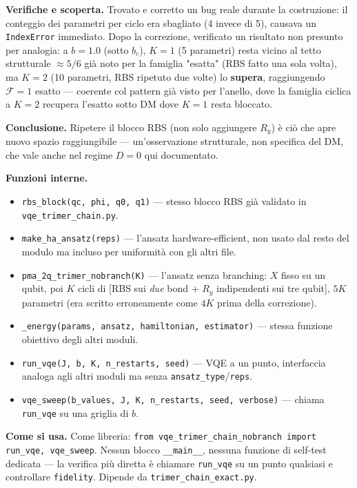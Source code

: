 \documentclass[11pt,a4paper]{article}
\begin{document}
\textbf{Verifiche e scoperta.} Trovato e corretto un bug reale durante la
costruzione: il conteggio dei parametri per ciclo era sbagliato (4 invece di 5),
causava un \texttt{IndexError} immediato. Dopo la correzione, verificato un risultato
non presunto per analogia: a $b=1.0$ (sotto $b_c$), $K=1$ (5 parametri) resta vicino al
tetto strutturale $\approx5/6$ già noto per la famiglia "esatta" (RBS fatto una sola
volta), ma $K=2$ (10 parametri, RBS ripetuto due volte) lo \textbf{supera},
raggiungendo $\mathcal F=1$ esatto — coerente col pattern già visto per l'anello, dove
la famiglia ciclica a $K=2$ recupera l'esatto sotto DM dove $K=1$ resta bloccato.

\textbf{Conclusione.} Ripetere il blocco RBS (non solo aggiungere $R_y$) è ciò che
apre nuovo spazio raggiungibile — un'osservazione strutturale, non specifica del DM,
che vale anche nel regime $D=0$ qui documentato.

\textbf{Funzioni interne.}
\begin{itemize}
\item \texttt{rbs\_block(qc,\ phi,\ q0,\ q1)} — stesso blocco RBS già validato in
\texttt{vqe\_trimer\_chain.py}.
\item \texttt{make\_ha\_ansatz(reps)} — l'ansatz hardware-efficient, non usato dal
resto del modulo ma incluso per uniformità con gli altri file.
\item \texttt{pma\_2q\_trimer\_nobranch(K)} — l'ansatz senza branching: $X$ fisso
su un qubit, poi $K$ cicli di [RBS sui \emph{due} bond + $R_y$ indipendenti sui tre
qubit], $5K$ parametri (era scritto erroneamente come $4K$ prima della correzione).
\item \texttt{\_energy(params,\ ansatz,\ hamiltonian,\ estimator)} — stessa
funzione obiettivo degli altri moduli.
\item \texttt{run\_vqe(J,\ b,\ K,\ n\_restarts,\ seed)} — VQE a un punto, interfaccia
analoga agli altri moduli ma senza \texttt{ansatz\_type}/\texttt{reps}.
\item \texttt{vqe\_sweep(b\_values,\ J,\ K,\ n\_restarts,\ seed,\ verbose)} — chiama
\texttt{run\_vqe} su una griglia di $b$.
\end{itemize}

\textbf{Come si usa.} Come libreria: \texttt{from vqe\_trimer\_chain\_nobranch
import run\_vqe, vqe\_sweep}. Nessun blocco \texttt{\_\_main\_\_}, nessuna funzione
di self-test dedicata — la verifica più diretta è chiamare \texttt{run\_vqe} su un
punto qualsiasi e controllare \texttt{fidelity}. Dipende da
\texttt{trimer\_chain\_exact.py}.
\end{document}
